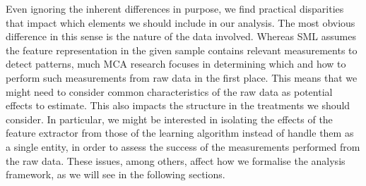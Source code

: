 Even ignoring the inherent differences in purpose, 
we find practical disparities that impact which elements
we should include in our analysis.
%
The most obvious difference in this sense is the nature of the data
involved.
%
Whereas SML assumes the feature representation in the given sample
contains relevant measurements to detect patterns,
much MCA research focuses in determining which and how to perform such
measurements from raw data in the first place.
%
This means that we might need to consider common characteristics of the
raw data as potential effects to estimate.
%
This also impacts the structure in the treatments we should consider.
%
In particular, we might be interested in isolating the effects of the
feature extractor from those of the learning algorithm
instead of handle them as a single entity, in order to
assess the success of the measurements performed from the raw data.
%
These issues, among others, affect how we formalise the analysis
framework, as we will see in the following sections.
